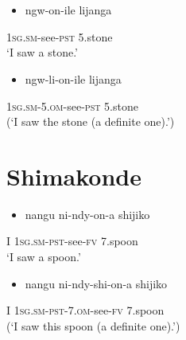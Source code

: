 \documentclass[output=paper]{langsci/langscibook}
\begin{document}

\chapter[Shimakonde]{}
\setcounter{itemize}{0}
\begin{itemize}
\item \gll ngw-on-ile                     lijanga\\
\end{itemize}
     \textsc{1sg.sm}{}-see-\textsc{pst}             5.stone\\
\glt ‘I saw a stone.’
\z

\begin{itemize}
\item \gll *ngw-li-on-ile                        lijanga\\
\end{itemize}
     \textsc{1sg.sm-5.om}{}-see-\textsc{pst}            5.stone\\
\glt (‘I saw the stone (a definite one).’)
\z

\chapter[Shimakonde]{Shimakonde}
\setcounter{itemize}{0}
\begin{itemize}
\item \gll nangu       ni-ndy-on-a                   shijiko\\
\end{itemize}
     I               \textsc{1sg.sm-pst}{}-see-\textsc{fv}        7.spoon\\
\glt ‘I saw a spoon.’
\z

\begin{itemize}
\item \gll *nangu      ni-ndy-shi-on-a                      shijiko\\
\end{itemize}
     I                \textsc{1sg.sm-pst-7.om}{}-see-\textsc{fv}        7.spoon\\
\glt (‘I saw this spoon (a definite one).’)
\z
\end{document}
